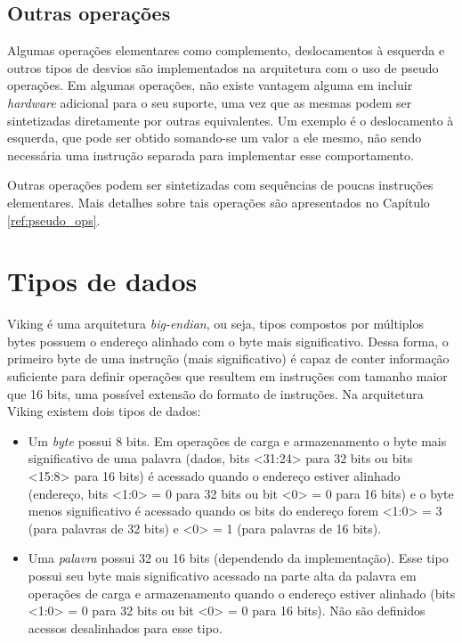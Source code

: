 \documentclass{extreport}
\begin{document}
\subsection{Outras operações}
Algumas operações elementares como complemento, deslocamentos à esquerda e outros tipos de desvios são implementados na arquitetura com o uso de pseudo operações. Em algumas operações, não existe vantagem alguma em incluir \textit{hardware} adicional para o seu suporte, uma vez que as mesmas podem ser sintetizadas diretamente por outras equivalentes. Um exemplo é o deslocamento à esquerda, que pode ser obtido somando-se um valor a ele mesmo, não sendo necessária uma instrução separada para implementar esse comportamento.

Outras operações podem ser sintetizadas com sequências de poucas instruções elementares. Mais detalhes sobre tais operações são apresentados no Capítulo \ref{ref:pseudo_ops}.

\section{Tipos de dados}
\label{ref:data_types}
Viking é uma arquitetura \textit{big-endian}, ou seja, tipos compostos por múltiplos bytes possuem o endereço alinhado com o byte mais significativo. Dessa forma, o primeiro byte de uma instrução (mais significativo) é capaz de conter informação suficiente para definir operações que resultem em instruções com tamanho maior que 16 bits, uma possível extensão do formato de instruções. Na arquitetura Viking existem dois tipos de dados:

\begin{itemize}
\item Um \textit{byte} possui 8 bits. Em operações de carga e armazenamento o byte mais significativo de uma palavra (dados, bits <31:24> para 32 bits ou bits <15:8> para 16 bits) é acessado quando o endereço estiver alinhado (endereço, bits <1:0> = 0 para 32 bits ou bit <0> = 0 para 16 bits) e o byte menos significativo é acessado quando os bits do endereço forem <1:0> = 3 (para palavras de 32 bits) e <0> = 1 (para palavras de 16 bits).
\item Uma \textit{palavra} possui 32 ou 16 bits (dependendo da implementação). Esse tipo possui seu byte mais significativo acessado na parte alta da palavra em operações de carga e armazenamento quando o endereço estiver alinhado (bits <1:0> = 0 para 32 bits ou bit <0> = 0 para 16 bits). Não são definidos acessos desalinhados para esse tipo.
\end{itemize}
\end{document}
